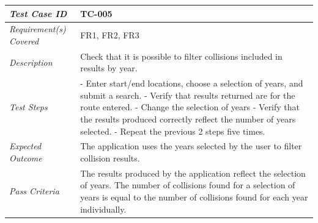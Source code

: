 \documentclass[authoryearcitations]{UoYCSproject}
\begin{document}
\begin{tabular}{| p{2.5cm} | p{11cm} |}
	\hline
	\textit{Test Case ID} & TC-005 \\ \hline
	\textit{Requirement(s) Covered} & FR1, FR2, FR3 \\ \hline
	\textit{Description} & Check that it is possible to filter collisions included in results by year. \\ \hline
	\textit{Test Steps}& - Enter start/end locations, choose a selection of years, and submit a search.
	\newline - Verify that results returned are for the route entered.
	\newline - Change the selection of years
	\newline - Verify that the results produced correctly reflect the number of years selected.
	\newline - Repeat the previous 2 steps five times.
 \\ \hline
	\textit{Expected Outcome} & The application uses the years selected by the user to filter collision results.  \\ \hline
	\textit{Pass Criteria} & The results produced by the application reflect the selection of years. The number of collisions found for a selection of years is equal to the number of collisions found for each year individually.  \\ \hline
\end{tabular}
\end{document}
